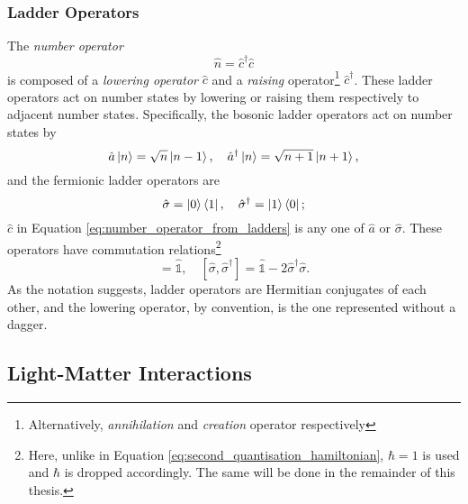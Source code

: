 \subsubsection{Ladder Operators}
The \textit{number operator}
\begin{equation}
\hat{n}=\hat{c}^\dagger\hat{c} \label{eq:number_operator_from_ladders}
\end{equation}
is composed of a \textit{lowering operator} $\hat{c}$ and a \textit{raising} operator\footnote{Alternatively, \textit{annihilation} and \textit{creation} operator respectively} $\hat{c}^\dagger$. These ladder operators act on number states by lowering or raising them respectively to adjacent number states. Specifically, the bosonic ladder operators act on number states by
\begin{equation}
    \hat{a}\left|n\right\rangle = \sqrt{n}\left|n-1\right\rangle, \quad \hat{a}^\dagger\left|n\right\rangle = \sqrt{n+1}\left|n+1\right\rangle,
\end{equation}
and the fermionic ladder operators are
\begin{equation}
    \hat{\sigma} = \left|0\right\rangle\left\langle1\right|, \quad \hat{\sigma}^\dagger = \left|1\right\rangle\left\langle0\right|;
\end{equation}
$\hat{c}$ in Equation \ref{eq:number_operator_from_ladders} is any one of $\hat{a}$ or $\hat{\sigma}$. These operators have commutation relations\footnote{Here, unlike in Equation \ref{eq:second_quantisation_hamiltonian}, $\hbar=1$ is used and $\hbar$ is dropped accordingly. The same will be done in the remainder of this thesis.}
\begin{equation}
    [\hat{a}, \hat{a}^\dagger] = \hat{\mathds{1}}, \quad [\hat{\sigma}, \hat{\sigma}^\dagger] = \hat{\mathds{1}} - 2\hat{\sigma}^\dagger\hat{\sigma}.
\end{equation}
As the notation suggests, ladder operators are Hermitian conjugates of each other, and the lowering operator, by convention, is the one represented without a dagger.

\subsection{Light-Matter Interactions}

